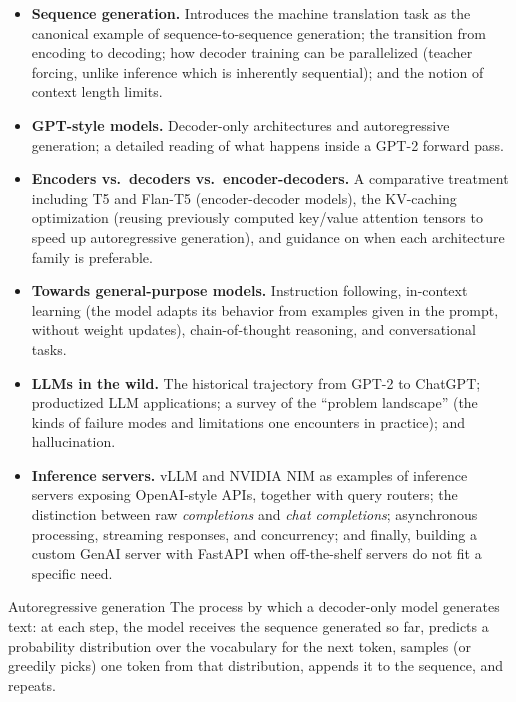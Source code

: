 \begin{itemize}
    \item \textbf{Sequence generation.} Introduces the machine translation task as the canonical example of sequence-to-sequence generation; the transition from encoding to decoding; how decoder training can be parallelized (teacher forcing, unlike inference which is inherently sequential); and the notion of context length limits.

    \vspace{0.2cm}
    \item \textbf{GPT-style models.} Decoder-only architectures and autoregressive generation; a detailed reading of what happens inside a GPT-2 forward pass.

    \vspace{0.2cm}
    \item \textbf{Encoders vs.\ decoders vs.\ encoder-decoders.} A comparative treatment including T5 and Flan-T5 (encoder-decoder models), the KV-caching optimization (reusing previously computed key/value attention tensors to speed up autoregressive generation), and guidance on when each architecture family is preferable.

    \vspace{0.2cm}
    \item \textbf{Towards general-purpose models.} Instruction following, in-context learning (the model adapts its behavior from examples given in the prompt, without weight updates), chain-of-thought reasoning, and conversational tasks.

    \vspace{0.2cm}
    \item \textbf{LLMs in the wild.} The historical trajectory from GPT-2 to ChatGPT; productized LLM applications; a survey of the ``problem landscape'' (the kinds of failure modes and limitations one encounters in practice); and hallucination.

    \vspace{0.2cm}
    \item \textbf{Inference servers.} vLLM and NVIDIA NIM as examples of inference servers exposing OpenAI-style APIs, together with query routers; the distinction between raw \emph{completions} and \emph{chat completions}; asynchronous processing, streaming responses, and concurrency; and finally, building a custom GenAI server with FastAPI when off-the-shelf servers do not fit a specific need.
\end{itemize}

\begin{defbox}{Autoregressive generation}
The process by which a decoder-only model generates text: at each step, the model receives the sequence generated so far, predicts a probability distribution over the vocabulary for the next token, samples (or greedily picks) one token from that distribution, appends it to the sequence, and repeats.
\end{defbox}

